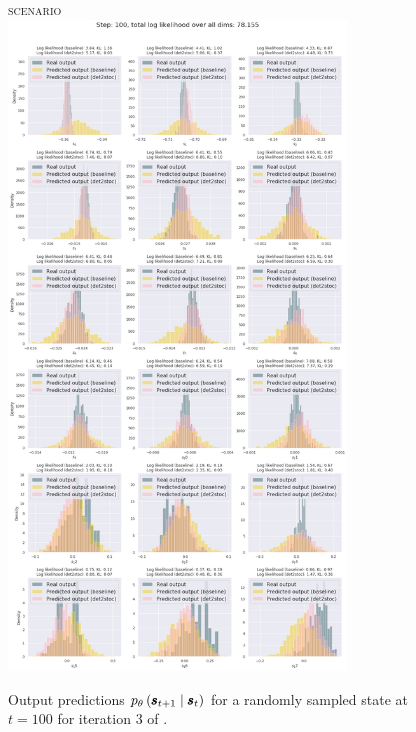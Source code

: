 \begin{figure}
    \centering
    \textsc{\MakeLowercase{\ws{} scenario}}\\
    \medskip
    \includegraphics[width=0.8\textwidth,trim=0 0 0 70,clip]{img/windyslope/output/output_distribution_step100_delta_all}
    \caption{Output predictions $\ptheta \protect\given*{\vns}{\vs}$ for a randomly sampled state at $t=100$ for iteration 3 of \dettostoc{}.}
    \label{fig:output_distribution_step100_dettostoc}
\end{figure}


